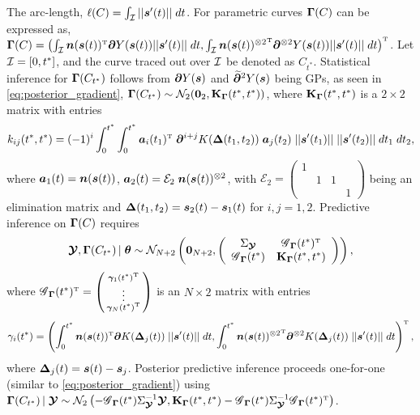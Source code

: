 The arc-length, $\ell(C) = \int_\I||\bs'(t)||\;dt$. For parametric curves $\bGamma(C)$ can be expressed as, $\bGamma(C) = \left(\int_\I \bn(\bs(t))^{\T}\bpartial Y(\bs(t))||\bs'(t)||\;dt, \int_\I{\bn(\bs(t))^{\otimes 2}}^{\T}\bpartial^{\otimes 2} Y(\bs(t))||\bs'(t)||\;dt\right)^{\T}$. Let $\mathcal{I} = [0,t^*]$, and the curve traced out over $\mathcal{I}$ be denoted as $C_{t^*}$. Statistical inference for $\bGamma(C_{t^*})$ follows from $\bpartial Y(\bs)$ and $\widetilde{\bpartial}^2Y(\bs)$ being GPs, as seen in \ref{eq:posterior_gradient}, $\bGamma(C_{t^*})\sim\N_2(\0_2, \bK_\bGamma(t^*,t^*))$, where $\bK_\bGamma(t^*,t^*)$ is a $2\times 2$ matrix with entries 
\begin{equation}\label{eq:variance_wm}
    k_{ij}(t^*,t^*)= (-1)^i\int_0^{t^*}\int_0^{t^*}\ba_i(t_1)^{\T}\;\bpartial^{i+j}K(\bDelta(t_1,t_2))\;\ba_j(t_2)\;||\bs'(t_1)||\;||\bs'(t_2)||\;dt_1\;dt_2,
\end{equation}
where $\ba_1(t)=\bn(\bs(t))$, $\ba_2(t)=\mathcal{E}_2\;\bn(\bs(t))^{\otimes 2}$, with $\mathcal{E}_2= \left(\begin{smallmatrix}
        1 & & & \\ & 1 & 1 & \\ & & & 1
    \end{smallmatrix}\right)$ being an elimination matrix and $\bDelta(t_1,t_2)=\bs_2(t)-\bs_1(t)$ for $i,j = 1,2$. Predictive inference on $\bGamma(C)$ requires
\begin{equation}\label{eq:joint-wm}
   \Y, \bGamma(C_{t^*})\given \btheta\sim  \N_{N+2}\left(\0_{N+2},\left(\begin{array}{cc}
         \Sigma_\Y & \G_\bGamma(t^*)^{\T} \\
         \G_\bGamma(t^*) & \bK_\bGamma(t^*, t^*)
    \end{array}\right)\right),
\end{equation}
where $\G_\bGamma(t^*)^{\T}=\left(\begin{smallmatrix}\bgamma_1(t^*)^{\T} \\ \vdots \\\bgamma_N(t^*)^{\T}\end{smallmatrix}\right)$ is an $N\times 2$ matrix with entries 
\begin{equation}\label{eq:cross-cov-wm}
    \gamma_i(t^*)=\left(\int_0^{t^*}\bn(\bs(t))^{\T} \bpartial K(\bDelta_j(t))\;||\bs'(t)||\;dt, \int_0^{t^*}{\bn(\bs(t))^{\otimes 2}}^{\T} \bpartial^{\otimes 2} K(\bDelta_j(t))\;||\bs'(t)||\;dt\right)^{\T},
\end{equation}
where $\bDelta_j(t) =  \bs(t) - \bs_j$. Posterior predictive inference proceeds one-for-one (similar to \ref{eq:posterior_gradient}) using $\bGamma(C_{t^*})\given \Y\sim \N_2\left(-\G_\bGamma(t^*)\Sigma_\Y^{-1}\Y, \bK_\bGamma(t^*, t^*) - \G_\bGamma(t^*)\Sigma_\Y^{-1}\G_\bGamma(t^*)^{\T}\right)$.

